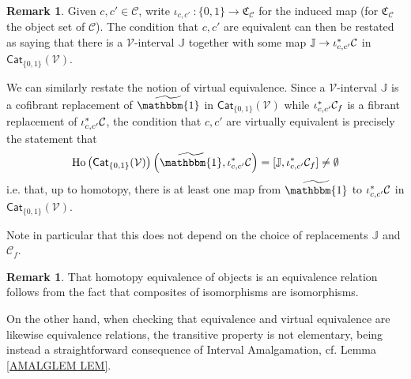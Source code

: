 \documentclass[a4paper,10pt
 ,final
]{article}%
\numberwithin{equation}{section}
\numberwithin{figure}{section}
\theoremstyle{definition} %
\newtheorem{remark}[equation]{Remark}%
\DeclareMathOperator{\Ho}{Ho}
\newcommand{\V}{\ensuremath{\mathcal V}}
\newcommand{\1}{\ensuremath{\mathbbm 1}}%
\begin{document}
\begin{remark}\label{VIRTEQRESTA REM}
Given $c,c' \in \mathcal{C}$, write $\iota_{c,c'} \ \colon \{0,1\} \to \mathfrak{C}_{\mathcal{C}}$
for the induced map
(for $\mathfrak{C}_{\mathcal{C}}$ the object set of 
$\mathcal{C}$).
%
The condition that $c,c'$ are equivalent can then be restated as saying that
there is a $\V$-interval $\mathbb{J}$
together with some map $\mathbb{J} \to \iota^{\**}_{c,c'}\mathcal{C}$ in $\mathsf{Cat}_{\{0,1\}}(\V)$. 

We can similarly restate the notion of virtual equivalence.
Since a $\V$-interval $\mathbb{J}$ is a cofibrant replacement of $\widetilde{\mathbbm{1}}$ in $\mathsf{Cat}_{\{0,1\}}(\V)$
while $\iota^{\**}_{c,c'} \mathcal{C}_f$ is a fibrant replacement of $\iota^{\**}_{c,c'} \mathcal{C}$,
the condition that $c,c'$ are virtually equivalent is precisely the statement that
\[
\Ho \left(\mathsf{Cat}_{\{0,1\}}(\V)\right)\left(\widetilde{\mathbbm{1}},\iota^{\**}_{c,c'} \mathcal{C}\right)
=
[\mathbb{J},\iota^{\**}_{c,c'} \mathcal{C}_f] 
\neq
 \emptyset
\]
i.e. that, up to homotopy, there is at least one map from $\widetilde{\mathbbm{1}}$ to $\iota^{\**}_{c,c'} \mathcal{C}$
in $\mathsf{Cat}_{\{0,1\}}(\V)$.

Note in particular that this does not depend on the choice of %
replacements 
$\mathbb{J}$ and $\mathcal{C}_f$.
\end{remark}


\begin{remark}
That homotopy equivalence of objects is an equivalence relation 
follows from the fact that composites of isomorphisms are isomorphisms.

On the other hand, when checking that equivalence and virtual equivalence are likewise equivalence relations,
the transitive property is not elementary, being instead 
a straightforward consequence of Interval Amalgamation, cf. Lemma \ref{AMALGLEM LEM}.
\end{remark}
\end{document}
